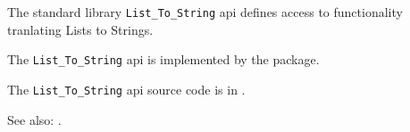 
The standard library {\tt List\_To\_String} api defines access to functionality tranlating 
Lists to Strings.

The {\tt List\_To\_String} api is implemented by the  package.

The {\tt List\_To\_String} api source code is in .

See also:  .